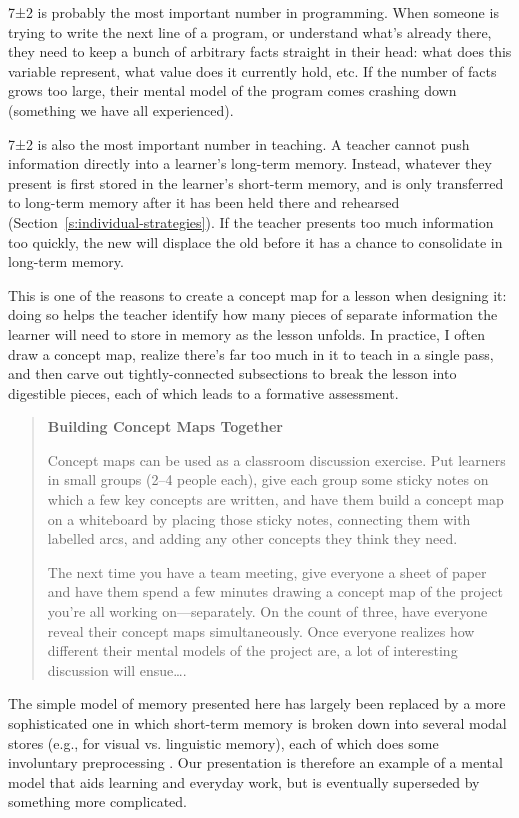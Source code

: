 7±2 is probably the most important number in programming. When
someone is trying to write the next line of a program, or understand
what's already there, they need to keep a bunch of arbitrary facts
straight in their head: what does this variable represent, what value
does it currently hold, etc. If the number of facts grows too large,
their mental model of the program comes crashing down (something we have
all experienced).

7±2 is also the most important number in teaching. A teacher cannot
push information directly into a learner's long-term memory. Instead,
whatever they present is first stored in the learner's short-term
memory, and is only transferred to long-term memory after it has been
held there and rehearsed (Section~\ref{s:individual-strategies}). If the
teacher presents too much information too quickly, the new will
displace the old before it has a chance to consolidate in long-term
memory.

This is one of the reasons to create a concept map for a lesson when
designing it: doing so helps the teacher identify how many pieces of
separate information the learner will need to store in memory as the
lesson unfolds. In practice, I often draw a concept map, realize there's
far too much in it to teach in a single pass, and then carve out
tightly-connected subsections to break the lesson into digestible
pieces, each of which leads to a formative assessment.

\begin{quote}\setlength{\parindent}{0pt}
\textbf{Building Concept Maps Together}

Concept maps can be used as a classroom discussion exercise. Put
learners in small groups (2--4 people each), give each group some
sticky notes on which a few key concepts are written, and have them
build a concept map on a whiteboard by placing those sticky notes,
connecting them with labelled arcs, and adding any other concepts they
think they need.

The next time you have a team meeting, give everyone a sheet of paper
and have them spend a few minutes drawing a concept map of the project
you're all working on---separately. On the count of three, have everyone
reveal their concept maps simultaneously. Once everyone realizes how
different their mental models of the project are, a lot of interesting
discussion will ensue\ldots{}.
\end{quote}

The simple model of memory presented here has largely been replaced by a
more sophisticated one in which short-term memory is broken down into
several modal stores (e.g., for visual vs. linguistic memory), each of
which does some involuntary preprocessing \cite{Mill2016a}. Our
presentation is therefore an example of a mental model that aids
learning and everyday work, but is eventually superseded by something
more complicated.

